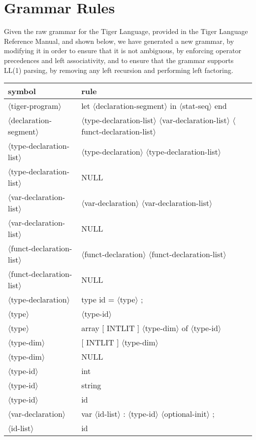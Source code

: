 \documentclass[11pt, fleqn]{article}
\newcommand{\atag}[1]{$\langle$#1$\rangle$}
\begin{document}
\section{Grammar Rules}

Given the raw grammar for the Tiger Language, provided in the Tiger Language Reference Manual, and shown below, we have generated a new grammar, by modifying it in order to ensure that it is not ambiguous, by enforcing operator precedences and left associativity, and to ensure that the grammar supports LL(1) parsing, by removing any left recursion and performing left factoring.

\begin{longtable}{l|l}
symbol							&	rule								\\
\hline
\atag{tiger-program}				&	let \atag{declaration-segment} in \atag{stat-seq} end				\\
\atag{declaration-segment}		&	\atag{type-declaration-list}	\atag{var-declaration-list} \atag{funct-declaration-list}	\\
\atag{type-declaration-list}		&	\atag{type-declaration} \atag{type-declaration-list}	\\
\atag{type-declaration-list}		&	NULL		\\
\atag{var-declaration-list}		&	\atag{var-declaration} \atag{var-declaration-list}	\\
\atag{var-declaration-list}		&	NULL		\\
\atag{funct-declaration-list}	&	\atag{funct-declaration} \atag{funct-declaration-list}	\\
\atag{funct-declaration-list}	&	NULL		\\
\atag{type-declaration}			&	type id = \atag{type} ;		\\
\atag{type}						&	\atag{type-id}		\\
\atag{type}						&	array [ INTLIT ] \atag{type-dim} of \atag{type-id}	\\
\atag{type-dim}					&	[ INTLIT ] \atag{type-dim}	\\
\atag{type-dim}					&	NULL		\\
\atag{type-id}					&	int		\\
\atag{type-id}					&	string		\\
\atag{type-id}					&	id		\\
\atag{var-declaration}			&	var \atag{id-list} : \atag{type-id} \atag{optional-init} ;		\\
\atag{id-list}					&	id		\\

\end{longtable}
\end{document}
